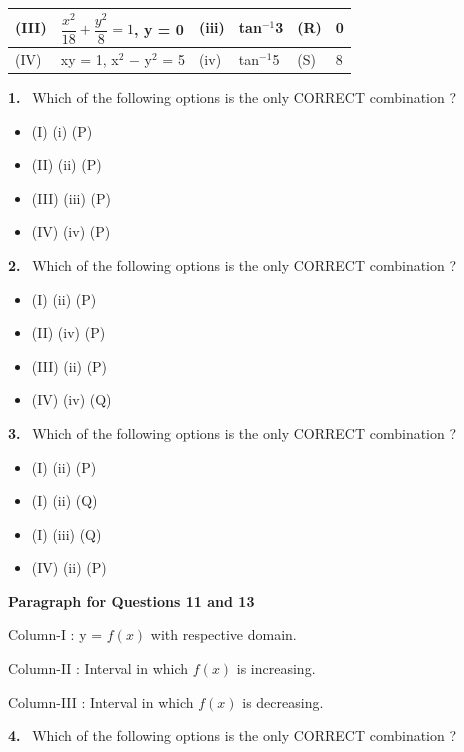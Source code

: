 \documentclass[10pt]{extarticle}
\newcommand{\qn}[1]{\par\smallskip\noindent\textbf{#1.}~}
\newcommand{\paraq}[2]{\par\smallskip\noindent\textbf{Paragraph for Questions #1 and #2}\par}
\newenvironment{qoptions}{\begin{itemize}[leftmargin=1.8em,itemsep=1pt,topsep=2pt,label={}]}{\end{itemize}}
\newcommand{\opt}[2]{\item[(#1)] #2}
\begin{document}
\begin{multicols}{2}
{\begin{tabular}{|L{.7cm}|L{2.6cm}|L{.8cm}|L{1.5cm}|L{.6cm}|L{.6cm}|}
(III) & $\dfrac{x^2}{18} + \dfrac{y^2}{8} = 1$, y = 0 & (iii) & tan$^{-1}$3 & (R) & 0\\\hline
(IV) & xy = 1, x$^2$ $-$ y$^2$ = 5 & (iv) & tan$^{-1}$5 & (S) & 8\\\hline
\end{tabular}}\par
\qn{1} Which of the following options is the only CORRECT combination ?
\begin{qoptions}
\opt{A}{(I) (i) (P)}
\opt{B}{(II) (ii) (P)}
\opt{C}{(III) (iii) (P)}
\opt{D}{(IV) (iv) (P)}
\end{qoptions}
\qn{2} Which of the following options is the only CORRECT combination ?
\begin{qoptions}
\opt{A}{(I) (ii) (P)}
\opt{B}{(II) (iv) (P)}
\opt{C}{(III) (ii) (P)}
\opt{D}{(IV) (iv) (Q)}
\end{qoptions}
\qn{3} Which of the following options is the only CORRECT combination ?
\begin{qoptions}
\opt{A}{(I) (ii) (P)}
\opt{B}{(I) (ii) (Q)}
\opt{C}{(I) (iii) (Q)}
\opt{D}{(IV) (ii) (P)}
\end{qoptions}
\paraq{11}{13}Column-I : y = $f(x)$ with respective domain.\par
Column-II : Interval in which $f(x)$ is increasing.\par
Column-III : Interval in which $f(x)$ is decreasing.\par
{}\par
\qn{4} Which of the following options is the only CORRECT combination ?

\end{multicols}
\end{document}
